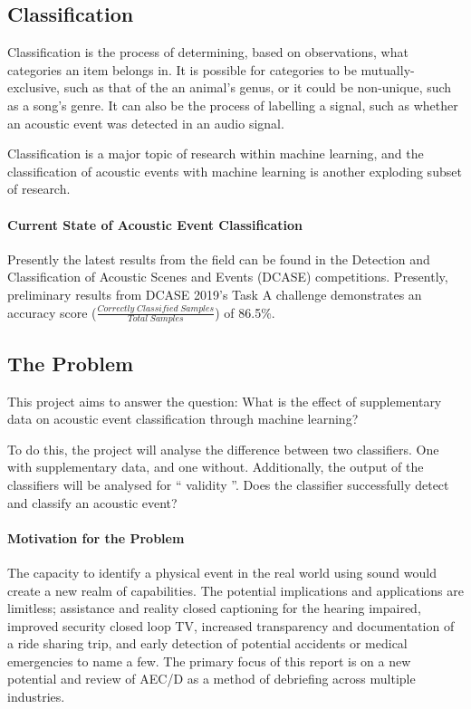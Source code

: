 \documentclass{UoNMCHA}
\newcommand{\inlineQuote}[1]{`` #1 ''}
\newcommand{\sref}[1] {Section \ref{#1}}
\numberwithin{equation}{section}
\begin{document}
\subsection{Classification}
Classification is the process of determining, based on observations, what categories an item belongs in. %
It is possible for categories to be mutually-exclusive, such as that of the an animal's genus, or it could be non-unique, such as a song's genre. It can also be the process of labelling a signal, such as whether an acoustic event was detected in an audio signal.

Classification is a major topic of research within machine learning, and the classification of acoustic events with machine learning is another exploding subset of research.

\paragraph{Current State of Acoustic Event Classification}
Presently the latest results from the field can be found in the Detection and Classification of
Acoustic Scenes and Events (DCASE) competitions. Presently, preliminary results from DCASE 2019's Task A challenge demonstrates an accuracy score ({\small $ \frac{Correctly\;Classified\;Samples}{Total\;Samples} $}) \cite{Mesaros2018_DCASE} of 86.5\%.

\subsection{The Problem}
This project aims to answer the question: What is the effect of supplementary data on acoustic event classification through machine learning?

To do this, the project will analyse the difference between two classifiers. One with supplementary data, and one without. %
Additionally, the output of the classifiers will be analysed for \inlineQuote{validity}. Does the classifier successfully detect and classify an acoustic event?


\paragraph{Motivation for the Problem}
The capacity to identify a physical event in the real world using sound would create a new realm of capabilities. The potential implications and applications are limitless; assistance and reality closed captioning for the hearing impaired, improved security closed loop TV, increased transparency and documentation of a ride sharing trip, and early detection of potential accidents or medical emergencies to name a few. The primary focus of this report is on a new potential and review of AEC/D as a method of debriefing across multiple industries.
\end{document}
